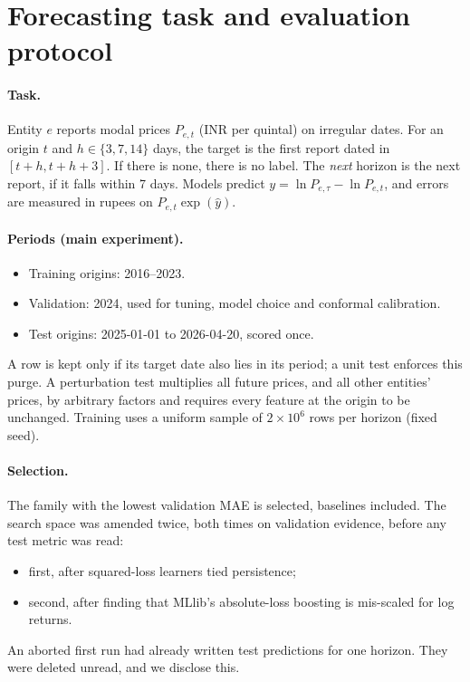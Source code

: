\section{Forecasting task and evaluation protocol}\label{sec:protocol}

\paragraph{Task.}
Entity $e$ reports modal prices $P_{e,t}$ (INR per quintal) on irregular dates.
For an origin $t$ and $h\in\{3,7,14\}$ days, the target is the first report dated in $[t+h,t+h+3]$. If there is none, there is no label.
The \emph{next} horizon is the next report, if it falls within 7 days.
Models predict $y=\ln P_{e,\tau}-\ln P_{e,t}$, and errors are measured in rupees on $P_{e,t}\exp(\hat y)$.

\paragraph{Periods (main experiment).}
\begin{itemize}
  \item Training origins: 2016--2023.
  \item Validation: 2024, used for tuning, model choice and conformal calibration.
  \item Test origins: 2025-01-01 to 2026-04-20, scored once.
\end{itemize}
A row is kept only if its target date also lies in its period; a unit test enforces this purge.
A perturbation test multiplies all future prices, and all other entities' prices, by arbitrary factors and requires every feature at the origin to be unchanged.
Training uses a uniform sample of $2\times10^6$ rows per horizon (fixed seed).

\paragraph{Selection.}
The family with the lowest validation MAE is selected, baselines included.
The search space was amended twice, both times on validation evidence, before any test metric was read:
\begin{itemize}
  \item first, after squared-loss learners tied persistence;
  \item second, after finding that MLlib's absolute-loss boosting is mis-scaled for log returns.
\end{itemize}
An aborted first run had already written test predictions for one horizon. They were deleted unread, and we disclose this.

